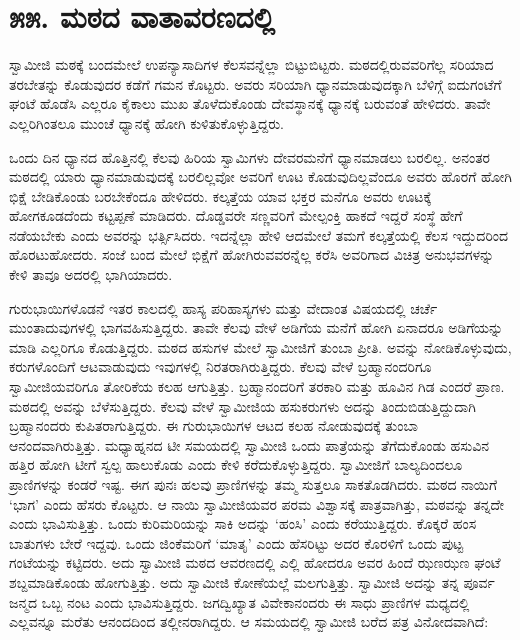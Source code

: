 
\chapter*{೫೫. ಮಠದ ವಾತಾವರಣದಲ್ಲಿ}

 ಸ್ವಾಮೀಜಿ ಮಠಕ್ಕೆ ಬಂದಮೇಲೆ ಉಪನ್ಯಾಸಾದಿಗಳ ಕೆಲಸವನ್ನೆಲ್ಲಾ ಬಿಟ್ಟುಬಿಟ್ಟರು. ಮಠದಲ್ಲಿರುವವರಿಗೆಲ್ಲ ಸರಿಯಾದ ತರಬೇತನ್ನು ಕೊಡುವುದರ ಕಡೆಗೆ ಗಮನ ಕೊಟ್ಟರು. ಅವರು ಸರಿಯಾಗಿ ಧ್ಯಾನಮಾಡುವುದಕ್ಕಾಗಿ ಬೆಳಿಗ್ಗೆ ಐದುಗಂಟೆಗೆ ಘಂಟೆ ಹೊಡೆಸಿ ಎಲ್ಲರೂ ಕೈಕಾಲು ಮುಖ ತೊಳೆದುಕೊಂಡು ದೇವಸ್ಥಾನಕ್ಕೆ ಧ್ಯಾನಕ್ಕೆ ಬರುವಂತೆ ಹೇಳಿದರು. ತಾವೇ ಎಲ್ಲರಿಗಿಂತಲೂ ಮುಂಚೆ ಧ್ಯಾನಕ್ಕೆ ಹೋಗಿ ಕುಳಿತುಕೊಳ್ಳುತ್ತಿದ್ದರು. 

 ಒಂದು ದಿನ ಧ್ಯಾನದ ಹೊತ್ತಿನಲ್ಲಿ ಕೆಲವು ಹಿರಿಯ ಸ್ವಾಮಿಗಳು ದೇವರಮನೆಗೆ ಧ್ಯಾನಮಾಡಲು ಬರಲಿಲ್ಲ. ಅನಂತರ ಮಠದಲ್ಲಿ ಯಾರು ಧ್ಯಾನಮಾಡುವುದಕ್ಕೆ ಬರಲಿಲ್ಲವೋ ಅವರಿಗೆ ಊಟ ಕೊಡುವುದಿಲ್ಲವೆಂದೂ ಅವರು ಹೊರಗೆ ಹೋಗಿ ಭಿಕ್ಷೆ ಬೇಡಿಕೊಂಡು ಬರಬೇಕೆಂದೂ ಹೇಳಿದರು. ಕಲ್ಕತ್ತೆಯ ಯಾವ ಭಕ್ತರ ಮನೆಗೂ ಅವರು ಊಟಕ್ಕೆ ಹೋಗಕೂಡದೆಂದು ಕಟ್ಟಪ್ಪಣೆ ಮಾಡಿದರು. ದೊಡ್ಡವರೇ ಸಣ್ಣವರಿಗೆ ಮೇಲ್ಪಂಕ್ತಿ ಹಾಕದೆ ಇದ್ದರೆ ಸಂಸ್ಥೆ ಹೇಗೆ ನಡೆಯಬೇಕು ಎಂದು ಅವರನ್ನು ಭರ್ತ್ಸಿಸಿದರು. ಇದನ್ನೆಲ್ಲಾ ಹೇಳಿ ಆದಮೇಲೆ ತಮಗೆ ಕಲ್ಕತ್ತೆಯಲ್ಲಿ ಕೆಲಸ ಇದ್ದುದರಿಂದ ಹೊರಟುಹೋದರು. ಸಂಜೆ ಬಂದ ಮೇಲೆ ಭಿಕ್ಷೆಗೆ ಹೋಗಿರುವವರನ್ನೆಲ್ಲ ಕರೆಸಿ ಅವರಿಗಾದ ವಿಚಿತ್ರ ಅನುಭವಗಳನ್ನು ಕೇಳಿ ತಾವೂ ಅದರಲ್ಲಿ ಭಾಗಿಯಾದರು. 

 ಗುರುಭಾಯಿಗಳೊಡನೆ ಇತರ ಕಾಲದಲ್ಲಿ ಹಾಸ್ಯ ಪರಿಹಾಸ್ಯಗಳು ಮತ್ತು ವೇದಾಂತ ವಿಷಯದಲ್ಲಿ ಚರ್ಚೆ ಮುಂತಾದುವುಗಳಲ್ಲಿ ಭಾಗವಹಿಸುತ್ತಿದ್ದರು. ತಾವೇ ಕೆಲವು ವೇಳೆ ಅಡಿಗೆಯ ಮನೆಗೆ ಹೋಗಿ ಏನಾದರೂ ಅಡಿಗೆಯನ್ನು ಮಾಡಿ ಎಲ್ಲರಿಗೂ ಕೊಡುತ್ತಿದ್ದರು. ಮಠದ ಹಸುಗಳ ಮೇಲೆ ಸ್ವಾಮೀಜಿಗೆ ತುಂಬಾ ಪ್ರೀತಿ. ಅವನ್ನು ನೋಡಿಕೊಳ್ಳುವುದು, ಕರುಗಳೊಂದಿಗೆ ಆಟವಾಡುವುದು ಇವುಗಳಲ್ಲಿ ನಿರತರಾಗಿರುತ್ತಿದ್ದರು. ಕೆಲವು ವೇಳೆ ಬ್ರಹ್ಮಾನಂದರಿಗೂ ಸ್ವಾಮೀಜಿಯವರಿಗೂ ತೋರಿಕೆಯ ಕಲಹ ಆಗುತ್ತಿತ್ತು. ಬ್ರಹ್ಮಾನಂದರಿಗೆ ತರಕಾರಿ ಮತ್ತು ಹೂವಿನ ಗಿಡ ಎಂದರೆ ಪ್ರಾಣ. ಮಠದಲ್ಲಿ ಅವನ್ನು ಬೆಳೆಸುತ್ತಿದ್ದರು. ಕೆಲವು ವೇಳೆ ಸ್ವಾಮೀಜಿಯ ಹಸುಕರುಗಳು ಅದನ್ನು ತಿಂದುಬಿಡುತ್ತಿದ್ದುದಾಗಿ ಬ್ರಹ್ಮಾನಂದರು ಕುಪಿತರಾಗುತ್ತಿದ್ದರು. ಈ ಗುರುಭಾಯಿಗಳ ಆಟದ ಕಲಹ ನೋಡುವುದಕ್ಕೆ ತುಂಬಾ ಆನಂದವಾಗಿರುತ್ತಿತ್ತು. ಮಧ್ಯಾಹ್ನನದ ಟೀ ಸಮಯದಲ್ಲಿ ಸ್ವಾಮೀಜಿ ಒಂದು ಪಾತ್ರೆಯನ್ನು ತೆಗೆದುಕೊಂಡು ಹಸುವಿನ ಹತ್ತಿರ ಹೋಗಿ ಟೀಗೆ ಸ್ವಲ್ಪ ಹಾಲುಕೊಡು ಎಂದು ಕೇಳಿ ಕರೆದುಕೊಳ್ಳುತ್ತಿದ್ದರು. ಸ್ವಾಮೀಜಿಗೆ ಬಾಲ್ಯದಿಂದಲೂ ಪ್ರಾಣಿಗಳನ್ನು ಕಂಡರೆ ಇಷ್ಟ. ಈಗ ಪುನಃ ಹಲವು ಪ್ರಾಣಿಗಳನ್ನು ತಮ್ಮ ಸುತ್ತಲೂ ಸಾಕತೊಡಗಿದರು. ಮಠದ ನಾಯಿಗೆ ‘ಭಾಗ’ ಎಂದು ಹೆಸರು ಕೊಟ್ಟರು. ಆ ನಾಯಿ ಸ್ವಾಮೀಜಿಯವರ ಪರಮ ವಿಶ್ವಾಸಕ್ಕೆ ಪಾತ್ರವಾಗಿತ್ತು, ಮಠವನ್ನು ತನ್ನದೇ ಎಂದು ಭಾವಿಸುತ್ತಿತ್ತು. ಒಂದು ಕುರಿಮರಿಯನ್ನು ಸಾಕಿ ಅದನ್ನು ‘ಹಂಸಿ’ ಎಂದು ಕರೆಯುತ್ತಿದ್ದರು. ಕೊಕ್ಕರೆ ಹಂಸ ಬಾತುಗಳು ಬೇರೆ ಇದ್ದವು. ಒಂದು ಜಿಂಕೆಮರಿಗೆ ‘ಮಾತೃ’ ಎಂದು ಹೆಸರಿಟ್ಟು ಅದರ ಕೊರಳಿಗೆ ಒಂದು ಪುಟ್ಟ ಗಂಟೆಯನ್ನು ಕಟ್ಟಿದರು. ಅದು ಸ್ವಾಮೀಜಿ ಮಠದ ಆವರಣದಲ್ಲಿ ಎಲ್ಲಿ ಹೋದರೂ ಅವರ ಹಿಂದೆ ಝಣಝಣ ಘಂಟೆ ಶಬ್ದಮಾಡಿಕೊಂಡು ಹೋಗುತ್ತಿತ್ತು. ಅದು ಸ್ವಾಮೀಜಿ ಕೋಣೆಯಲ್ಲೆ ಮಲಗುತ್ತಿತ್ತು. ಸ್ವಾಮೀಜಿ ಅದನ್ನು ತನ್ನ ಪೂರ್ವ ಜನ್ಮದ ಒಬ್ಬ ನಂಟ ಎಂದು ಭಾವಿಸುತ್ತಿದ್ದರು. ಜಗದ್ವಿಖ್ಯಾತ ವಿವೇಕಾನಂದರು ಈ ಸಾಧು ಪ್ರಾಣಿಗಳ ಮಧ್ಯದಲ್ಲಿ ಎಲ್ಲವನ್ನೂ ಮರೆತು ಆನಂದದಿಂದ ತಲ್ಲೀನರಾಗಿದ್ದರು. ಆ ಸಮಯದಲ್ಲಿ ಸ್ವಾಮೀಜಿ ಬರೆದ ಪತ್ರ ವಿನೋದವಾಗಿದೆ: 


